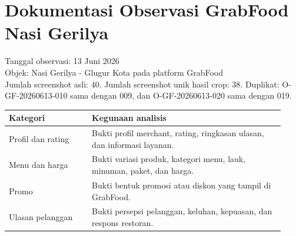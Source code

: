 ﻿\documentclass[10pt,a4paper]{article}
\begin{document}
\section*{Dokumentasi Observasi GrabFood Nasi Gerilya}
Tanggal observasi: 13 Juni 2026\\
Objek: Nasi Gerilya - Glugur Kota pada platform GrabFood\\
Jumlah screenshot asli: 40. Jumlah screenshot unik hasil crop: 38. Duplikat: O-GF-20260613-010 sama dengan 009, dan O-GF-20260613-020 sama dengan 019.

\begin{tabular}{@{}p{0.28\linewidth}p{0.65\linewidth}@{}}
\toprule
Kategori & Kegunaan analisis \\
\midrule
Profil dan rating & Bukti profil merchant, rating, ringkasan ulasan, dan informasi layanan. \\
Menu dan harga & Bukti variasi produk, kategori menu, lauk, minuman, paket, dan harga. \\
Promo & Bukti bentuk promosi atau diskon yang tampil di GrabFood. \\
Ulasan pelanggan & Bukti persepsi pelanggan, keluhan, kepuasan, dan respons restoran. \\
\bottomrule
\end{tabular}
\end{document}
